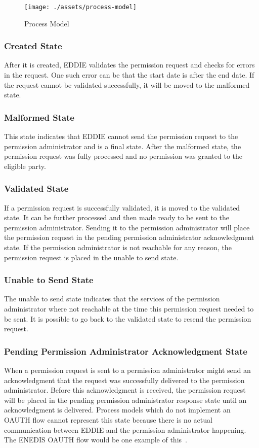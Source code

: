 \begin{figure}[h]
    \texttt{[image: ./assets/process-model]}
    \caption{Process Model}
    \label{fig:process-model}
\end{figure}

\subsubsection{Created State}
After it is created, EDDIE validates the permission request and checks for errors in the request.
One such error can be that the start date is after the end date.
If the request cannot be validated successfully, it will be moved to the malformed state.

\subsubsection{Malformed State}
This state indicates that EDDIE cannot send the permission request to the permission administrator and is a final state.
After the malformed state, the permission request was fully processed and no permission was granted to the eligible party.

\subsubsection{Validated State}
If a permission request is successfully validated, it is moved to the validated state.
It can be further processed and then made ready to be sent to the permission administrator.
Sending it to the permission administrator will place the permission request in the pending permission administrator acknowledgment state.
If the permission administrator is not reachable for any reason, the permission request is placed in the unable to send state.

\subsubsection{Unable to Send State}
The unable to send state indicates that the services of the permission administrator where not reachable at the time this permission request needed to be sent.
It is possible to go back to the validated state to resend the permission request.

\subsubsection{Pending Permission Administrator Acknowledgment State}
When a permission request is sent to a permission administrator might send an acknowledgment that the request was successfully delivered to the permission administrator.
Before this acknowledgment is received, the permission request will be placed in the pending permission administrator response state until an acknowledgment is delivered.
Process models which do not implement an OAUTH flow cannot represent this state because there is no actual communication between EDDIE and the permission administrator happening.
The ENEDIS OAUTH flow would be one example of this~\cite{enedis-dev-guide}.

